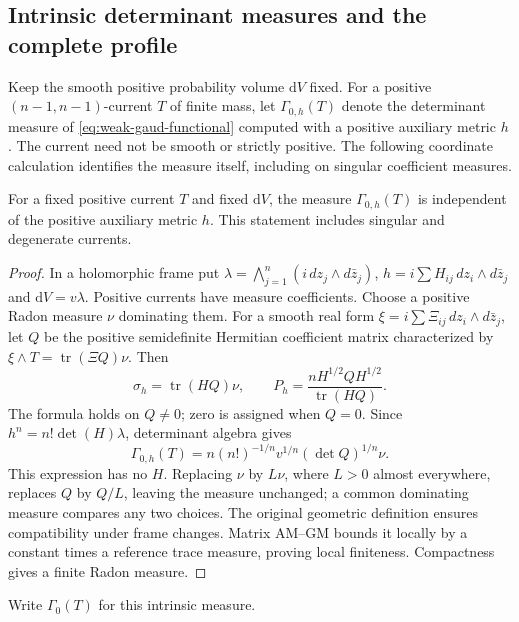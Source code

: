 \subsection{Intrinsic determinant measures and the complete profile}

Keep the smooth positive probability volume $\mathrm dV$ fixed. For a positive $(n-1,n-1)$-current $T$ of finite mass, let $\Gamma_{0,h}(T)$ denote the determinant measure of \eqref{eq:weak-gaud-functional} computed with a positive auxiliary metric $h$. The current need not be smooth or strictly positive. The following coordinate calculation identifies the measure itself, including on singular coefficient measures.

\begin{lemma}\label{lem:gaud-determinant-measure-intrinsic}
For a fixed positive current $T$ and fixed $\mathrm dV$, the measure
$\Gamma_{0,h}(T)$ is independent of the positive auxiliary metric $h$.
This statement includes singular and degenerate currents.
\end{lemma}
\begin{proof}
In a holomorphic frame put
$\lambda=\bigwedge_{j=1}^n(i\,dz_j\wedge d\bar z_j)$,
$h=i\sum H_{ij}\,dz_i\wedge d\bar z_j$ and $\mathrm dV=v\lambda$.
Positive currents have measure coefficients. Choose a positive
Radon measure $\nu$ dominating them. For a smooth real form
$\xi=i\sum\Xi_{ij}\,dz_i\wedge d\bar z_j$, let $Q$ be the
positive semidefinite Hermitian coefficient matrix characterized by
$\xi\wedge T=\operatorname{tr}(\Xi Q)\nu$. Then
\[
 \sigma_h=\operatorname{tr}(HQ)\nu,\qquad
 P_h=\frac{nH^{1/2}QH^{1/2}}{\operatorname{tr}(HQ)}.
\]
The formula holds on $Q\ne0$; zero is assigned when $Q=0$.
Since $h^n=n!\det(H)\lambda$, determinant algebra gives
\begin{equation}\label{eq:intrinsic-gaud-determinant-coordinate}
 \Gamma_{0,h}(T)
 =n(n!)^{-1/n}v^{1/n}(\det Q)^{1/n}\nu.
\end{equation}
This expression has no $H$. Replacing $\nu$ by $L\nu$, where
$L>0$ almost everywhere, replaces $Q$ by $Q/L$, leaving the
measure unchanged; a common dominating measure compares any two choices. The original geometric definition
ensures compatibility under frame changes. Matrix AM--GM bounds it
locally by a constant times a reference trace measure, proving local
finiteness. Compactness gives a finite Radon measure.
\end{proof}
Write $\Gamma_0(T)$ for this intrinsic measure.


